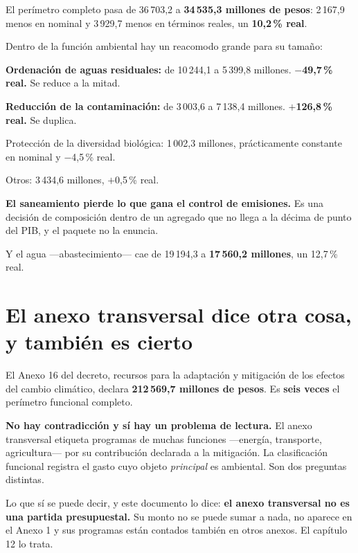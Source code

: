 El perímetro completo pasa de 36\,703,2 a \textbf{34\,535,3 millones de pesos}: 2\,167,9
menos en nominal y 3\,929,7 menos en términos reales, un \textbf{10,2\,\% real}.

Dentro de la función ambiental hay un reacomodo grande para su tamaño:

\begin{list}{}{\setlength{\leftmargin}{1.4em}\setlength{\itemsep}{2pt}}
\item[$\bullet$] \textbf{Ordenación de aguas residuales:} de 10\,244,1 a 5\,399,8 millones.
\textbf{$-$49,7\,\% real.} Se reduce a la mitad.
\item[$\bullet$] \textbf{Reducción de la contaminación:} de 3\,003,6 a 7\,138,4 millones.
\textbf{$+$126,8\,\% real.} Se duplica.
\item[$\bullet$] Protección de la diversidad biológica: 1\,002,3 millones, prácticamente
constante en nominal y $-$4,5\,\% real.
\item[$\bullet$] Otros: 3\,434,6 millones, $+$0,5\,\% real.
\end{list}

\textbf{El saneamiento pierde lo que gana el control de emisiones.} Es una decisión de
composición dentro de un agregado que no llega a la décima de punto del PIB, y el paquete no
la enuncia.

Y el agua ---abastecimiento--- cae de 19\,194,3 a \textbf{17\,560,2 millones}, un 12,7\,\%
real.

\section{El anexo transversal dice otra cosa, y también es cierto}

El Anexo 16 del decreto, recursos para la adaptación y mitigación de los efectos del cambio
climático, declara \textbf{212\,569,7 millones de pesos}. Es \textbf{seis veces} el perímetro
funcional completo.

\textbf{No hay contradicción y sí hay un problema de lectura.} El anexo transversal etiqueta
programas de muchas funciones ---energía, transporte, agricultura--- por su contribución
declarada a la mitigación. La clasificación funcional registra el gasto cuyo objeto
\emph{principal} es ambiental. Son dos preguntas distintas.

Lo que sí se puede decir, y este documento lo dice: \textbf{el anexo transversal no es una
partida presupuestal.} Su monto no se puede sumar a nada, no aparece en el Anexo 1 y sus
programas están contados también en otros anexos. El capítulo 12 lo trata.

